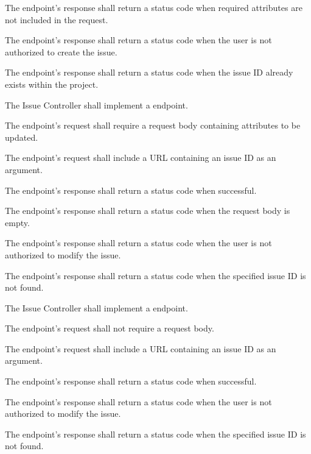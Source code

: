 \documentclass[12pt]{report}
\begin{document}
\begin{reqlist}
\begin{reqlist}
\begin{reqlist}
						\item The endpoint's response shall return a  status code when required attributes are not included in the request.
						\item The endpoint's response shall return a  status code when the user is not authorized to create the issue.
						\item The endpoint's response shall return a  status code when the issue ID already exists within the project.
					\end{reqlist}
					\item The Issue Controller shall implement a  endpoint.
					\begin{reqlist}
						\item The endpoint's request shall require a request body containing attributes to be updated.
						\item The endpoint's request shall include a URL containing an issue ID as an argument.
						\item The endpoint's response shall return a  status code when successful.
						\item The endpoint's response shall return a  status code when the request body is empty.
						\item The endpoint's response shall return a  status code when the user is not authorized to modify the issue.
						\item The endpoint's response shall return a  status code when the specified issue ID is not found.
					\end{reqlist}
					\item The Issue Controller shall implement a \code{DELETE} endpoint.
					\begin{reqlist}
						\item The endpoint's request shall not require a request body.
						\item The endpoint's request shall include a URL containing an issue ID as an argument.
						\item The endpoint's response shall return a  status code when successful.
						\item The endpoint's response shall return a  status code when the user is not authorized to modify the issue.
						\item The endpoint's response shall return a  status code when the specified issue ID is not found.
					\end{reqlist}
				\end{reqlist}
		\end{reqlist}
\end{document}
